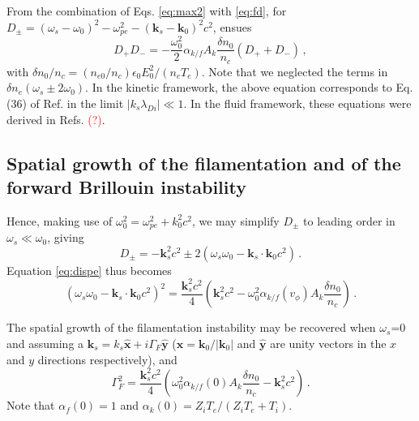 \documentclass[
 reprint,
 amsmath,amssymb,
 aps,
]{revtex4-1}
\begin{document}
From the combination of  Eqs. \eqref{eq:max2} with \eqref{eq:fd}, 
for $D_\pm= (\omega_s-\omega_0)^2 - \omega_{pe}^2 -( \mathbf{k}_s-\mathbf{k}_0) ^2c^2 $, ensues
\begin{equation}\label{eq:dispe}
    D_+D_- = -\frac{\omega_{0}^2}{2}\alpha_{k/f}A_k\frac{\delta n_0}{n_c} (D_++D_-) \, ,
\end{equation}
with $\delta n_0/n_c = (n_{e0}/n_c) \epsilon_0E_0^2/(n_c T_e)$.
Note that we neglected the terms in $\delta n_e(\omega_s \pm 2\omega_0)$.
In the kinetic framework, the above equation corresponds to Eq. (36) of Ref. \cite[]{POF_Cohen_79} in the limit $\vert k_s \lambda_{Di} \vert \ll 1$. In the fluid framework, these equations were derived in Refs. \cite[]{Kruer,phd_Michel,phd-Grech} \textcolor{red}{(?)}.

\subsection{Spatial growth of the filamentation and of the forward Brillouin instability}
Hence,  making use of $\omega_0^2=\omega_{pe}^2 +k_0^2c^2$, we may simplify $D_\pm$ to leading order in $\omega_s\ll\omega_0$, giving 
\begin{equation}\label{eq:dpm}
D_\pm = -\mathbf{k}_s^2c^2\pm 2(\omega_s\omega_0 - \mathbf{k}_s\cdot\mathbf{k}_0 c^2) \, .
\end{equation} 
Equation \eqref{eq:dispe} thus becomes 
\begin{equation}\label{eq:dispe2} 
(\omega_s\omega_0 - \mathbf{k}_s\cdot\mathbf{k}_0 c^2)^2
=\frac{\mathbf{k}_s^2c^2}{4}\left( \mathbf{k}_s^2c^2 - \omega_{0}^2\alpha_{k/f}(v_\phi)A_k\frac{\delta n_0}{n_c} \right) 
\, .
\end{equation}

The spatial growth of the filamentation instability may be recovered when $\omega_s$=0 and assuming a $\mathbf{k}_s = k_s \hat{\mathbf{x}} +i\Gamma_F \hat{\mathbf{y}}$ ($\hat{\mathbf{x}}=\mathbf{k}_0 /\vert \mathbf{k}_0 \vert $ and  $\hat{\mathbf{y}}$  are unity vectors in the $x$ and $y$ directions respectively), and 
\begin{equation}\label{eq:gf} 
\Gamma_F^2
=\frac{\mathbf{k}_s^2c^2}{4}\left( \omega_{0}^2\alpha_{k/f}(0)A_k\frac{\delta n_0}{n_c}- \mathbf{k}_s^2c^2 \right) 
\, .
\end{equation}
Note that $\alpha_f(0)=1$ and $\alpha_k(0)=Z_iT_e/(Z_iT_e+T_i)$.
\end{document}
